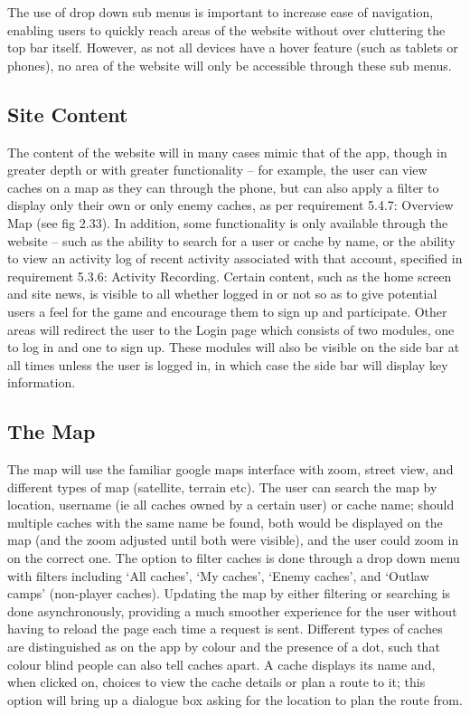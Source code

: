 The use of drop down sub menus is important to increase ease of navigation, enabling users to quickly reach areas of the website without over cluttering the top bar itself. However, as not all devices have a hover feature (such as tablets or phones), no area of the website will only be accessible through these sub menus.

\subsection{Site Content}

The content of the website will in many cases mimic that of the app, though in greater depth or with greater functionality – for example, the user can view caches on a map as they can through the phone, but can also apply a filter to display only their own or only enemy caches, as per requirement 5.4.7: Overview Map (see fig 2.33). In addition, some functionality is only available through the website – such as the ability to search for a user or cache by name, or the ability to view an activity log of recent activity associated with that account, specified in requirement 5.3.6: Activity Recording. Certain content, such as the home screen and site news, is visible to all whether logged in or not so as to give potential users a feel for the game and encourage them to sign up and participate. Other areas will redirect the user to the Login page which consists of two modules, one to log in and one to sign up. These modules will also be visible on the side bar at all times unless the user is logged in, in which case the side bar will display key information.

\subsection{The Map}

The map will use the familiar google maps interface with zoom, street view, and different types of map (satellite, terrain etc). The user can search the map by location, username (ie all caches owned by a certain user) or cache name; should multiple caches with the same name be found, both would be displayed on the map (and the zoom adjusted until both were visible), and the user could zoom in on the correct one. The option to filter caches is done through a drop down menu with filters including ‘All caches’, ‘My caches’, ‘Enemy caches’, and ‘Outlaw camps’ (non-player caches). Updating the map by either filtering or searching is done asynchronously, providing a much smoother experience for the user without having to reload the page each time a request is sent. Different types of caches are distinguished as on the app by colour and the presence of a dot, such that colour blind people can also tell caches apart. A cache displays its name and, when clicked on, choices to view the cache details or plan a route to it; this option will bring up a dialogue box asking for the location to plan the route from.

